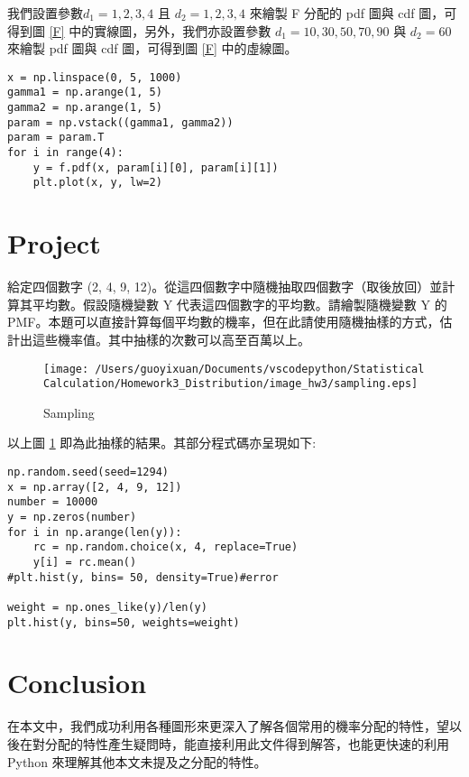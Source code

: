我們設置參數$d_1=1,2,3,4$ 且 $d_2=1,2,3,4$ 來繪製 F 分配的 pdf 圖與 cdf 圖，可得到圖 \ref{F} 中的實線圖，另外，我們亦設置參數 $d_1=10,30,50,70,90$ 與 $d_2=60$ 來繪製 pdf 圖與 cdf 圖，可得到圖 \ref{F} 中的虛線圖。

\begin{lstlisting}
x = np.linspace(0, 5, 1000)
gamma1 = np.arange(1, 5)
gamma2 = np.arange(1, 5)
param = np.vstack((gamma1, gamma2))
param = param.T
for i in range(4):
    y = f.pdf(x, param[i][0], param[i][1])
    plt.plot(x, y, lw=2)

\end{lstlisting}

\newpage

\section{Project}

給定四個數字 (2, 4, 9, 12)。從這四個數字中隨機抽取四個數字（取後放回）並計算其平均數。假設隨機變數 Y 代表這四個數字的平均數。請繪製隨機變數 Y 的 PMF。本題可以直接計算每個平均數的機率，但在此請使用隨機抽樣的方式，估計出這些機率值。其中抽樣的次數可以高至百萬以上。

\bigskip
\begin{figure}[H]
    \centering
        \texttt{[image: /Users/guoyixuan/Documents/vscodepython/Statistical Calculation/Homework3\_Distribution/image\_hw3/sampling.eps]}
    \caption{Sampling}
    \label{sampling}
\end{figure}

以上圖 \ref{sampling} 即為此抽樣的結果。其部分程式碼亦呈現如下:

\bigskip
\begin{lstlisting}
np.random.seed(seed=1294)
x = np.array([2, 4, 9, 12])
number = 10000
y = np.zeros(number)
for i in np.arange(len(y)):
    rc = np.random.choice(x, 4, replace=True)
    y[i] = rc.mean()
#plt.hist(y, bins= 50, density=True)#error

weight = np.ones_like(y)/len(y)
plt.hist(y, bins=50, weights=weight)
\end{lstlisting}

\section{Conclusion}

在本文中，我們成功利用各種圖形來更深入了解各個常用的機率分配的特性，望以後在對分配的特性產生疑問時，能直接利用此文件得到解答，也能更快速的利用 Python 來理解其他本文未提及之分配的特性。


